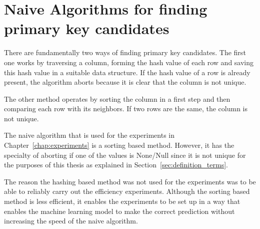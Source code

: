 \section{Naive Algorithms for finding primary key candidates}
There are fundamentally two ways of finding primary key candidates. The first one works by traversing a column, forming the hash value of each row and saving this hash value in a suitable data structure. If the hash value of a row is already present, the algorithm aborts because it is clear that the column is not unique.

The other method operates by sorting the column in a first step and then comparing each row with its neighbors. If two rows are the same, the column is not unique.

The naive algorithm that is used for the experiments in Chapter~\ref{chap:experiments} is a sorting based method. However, it has the specialty of aborting if one of the values is None/Null since it is not unique for the purposes of this thesis as explained in Section~\ref{sec:definition_terms}.

The reason the hashing based method was not used for the experiments was to be able to reliably carry out the efficiency experiments. Although the sorting based method is less efficient, it enables the experiments to be set up in a way that enables the machine learning model to make the correct prediction without increasing the speed of the naive algorithm.
